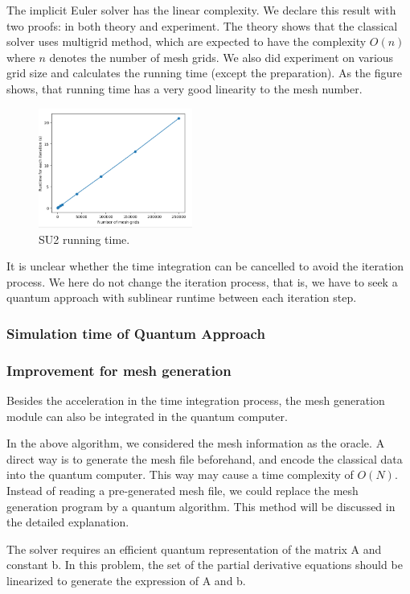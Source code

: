 \documentclass[%
 reprint,
 amsmath,amssymb,
pra,
]{revtex4-1}
\begin{document}
The implicit Euler solver has the linear complexity. We declare this result with two proofs: in both theory and experiment. The theory shows that the classical solver uses multigrid method, which are expected to have the complexity $O(n)$ where $n$ denotes the number of mesh grids. We also did experiment on various grid size and calculates the running time (except the preparation). As the figure shows, that running time has a very good linearity to the mesh number.
\begin{figure} 
\centering
\includegraphics[width=0.45\textwidth]{Fig/su2_speed.png}
\caption{SU2 running time.} \label{su2Speed}
\end{figure}

It is unclear whether the time integration can be cancelled to avoid the iteration process. We here do not change the iteration process, that is, we have to seek a quantum approach with sublinear runtime between each iteration step.

\subsubsection{Simulation time of Quantum Approach}

\subsubsection{Improvement for mesh generation}
Besides the acceleration in the time integration process, the mesh generation module can also be integrated in the quantum computer.

In the above algorithm, we considered the mesh information as the oracle. A direct way is to generate the mesh file beforehand, and encode the classical data into the quantum computer. This way may cause a time complexity of $O(N)$. Instead of reading a pre-generated mesh file, we could replace the mesh generation program by a quantum algorithm. This method will be discussed in the detailed explanation.

The solver requires an efficient quantum representation of the matrix A and constant b. In this problem, the set of the partial derivative equations should be linearized to generate the expression of A and b.
\end{document}
